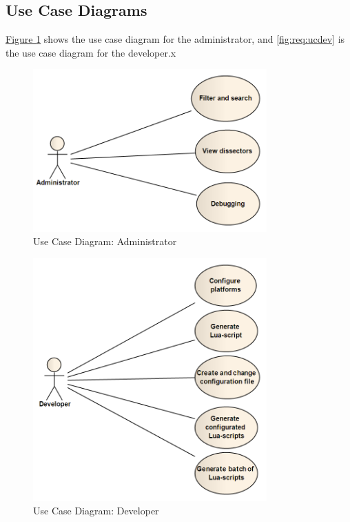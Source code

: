 \subsection{Use Case Diagrams}
\hyperref[fig:req:ucadm]{Figure \ref*{fig:req:ucadm}} shows the use case
diagram for the administrator, and \autoref{fig:req:ucdev} is the use case
diagram for the developer.x
\begin{figure}[htbp]
	\center
	\includegraphics[width=0.8\textwidth]{./planning/img/administrator.png}
	\caption{Use Case Diagram: Administrator\label{fig:req:ucadm}}
\end{figure}

\begin{figure}[htbp]
	\center
	\includegraphics[width=0.8\textwidth]{./planning/img/developer.png}
	\caption{Use Case Diagram: Developer\label{fig:req:ucdev}}
\end{figure}


